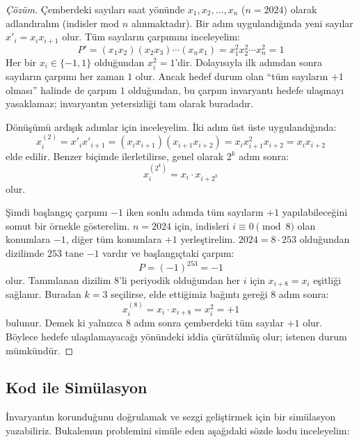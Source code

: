 \begin{proof}[Çözüm]
Çemberdeki sayıları saat yönünde $x_1, x_2, \dots, x_n$ ($n = 2024$) olarak adlandıralım (indisler mod $n$ alınmaktadır). Bir adım uygulandığında yeni sayılar $x'_i = x_i x_{i+1}$ olur. Tüm sayıların çarpımını inceleyelim:
\[
P' = (x_1 x_2)(x_2 x_3)\cdots(x_n x_1) = x_1^2 x_2^2 \cdots x_n^2 = 1
\]
Her bir $x_i \in \{-1, 1\}$ olduğundan $x_i^2 = 1$'dir. Dolayısıyla ilk adımdan sonra sayıların çarpımı her zaman $1$ olur. Ancak hedef durum olan ``tüm sayıların $+1$ olması'' halinde de çarpım $1$ olduğundan, bu çarpım invaryantı hedefe ulaşmayı yasaklamaz; invaryantın yetersizliği tam olarak buradadır.

Dönüşümü ardışık adımlar için inceleyelim. İki adım üst üste uygulandığında:
\[
x_i^{(2)} = x'_i x'_{i+1} = (x_i x_{i+1})(x_{i+1} x_{i+2}) = x_i x_{i+1}^2 x_{i+2} = x_i x_{i+2}
\]
elde edilir. Benzer biçimde ilerletilirse, genel olarak $2^k$ adım sonra:
\[
x_i^{(2^k)} = x_i \cdot x_{i+2^k}
\]
olur.

Şimdi başlangıç çarpımı $-1$ iken sonlu adımda tüm sayıların $+1$ yapılabileceğini somut bir örnekle gösterelim. $n = 2024$ için, indisleri $i \equiv 0 \pmod 8$ olan konumlara $-1$, diğer tüm konumlara $+1$ yerleştirelim. $2024 = 8 \cdot 253$ olduğundan dizilimde $253$ tane $-1$ vardır ve başlangıçtaki çarpım:
\[
P = (-1)^{253} = -1
\]
olur. Tanımlanan dizilim $8$'li periyodik olduğundan her $i$ için $x_{i+8} = x_i$ eşitliği sağlanır. Buradan $k = 3$ seçilirse, elde ettiğimiz bağıntı gereği $8$ adım sonra:
\[
x_i^{(8)} = x_i \cdot x_{i+8} = x_i^2 = +1
\]
bulunur. Demek ki yalnızca $8$ adım sonra çemberdeki tüm sayılar $+1$ olur. Böylece hedefe ulaşılamayacağı yönündeki iddia çürütülmüş olur; istenen durum mümkündür.
\end{proof}

\subsection{Kod ile Simülasyon}

İnvaryantın korunduğunu doğrulamak ve sezgi geliştirmek için bir simülasyon yazabiliriz. Bukalemun problemini simüle eden aşağıdaki sözde kodu inceleyelim:

